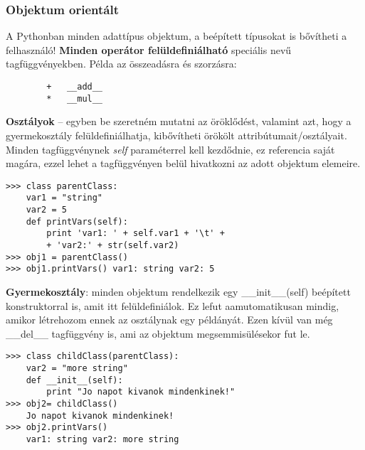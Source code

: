 \documentclass[a4paper,oneside,12pt]{article}
\begin{document}
\subsubsection{Objektum orientált}
A Pythonban minden adattípus objektum, a beépített típusokat is bővítheti a felhasználó! \textbf{Minden operátor felüldefiniálható} speciális nevű tagfüggvényekben.
Példa az összeadásra és szorzásra:
\begin{lstlisting}
		+	__add__
		*	__mul__
\end{lstlisting}

\textbf{Osztályok} -- egyben be szeretném mutatni az öröklődést, valamint azt, hogy a gyermekosztály felüldefiniálhatja, kibővítheti örökölt attribútumait/osztályait. Minden tagfüggvénynek \emph{self} paraméterrel kell kezdődnie, ez referencia saját magára, ezzel lehet a tagfüggvényen belül hivatkozni az adott objektum elemeire.
\begin{lstlisting}
>>> class parentClass:
	var1 = "string"
	var2 = 5
	def printVars(self):
		print 'var1: ' + self.var1 + '\t' +
		+ 'var2:' + str(self.var2)
>>> obj1 = parentClass()
>>> obj1.printVars() var1: string var2: 5
\end{lstlisting}

\textbf{Gyermekosztály}: minden objektum rendelkezik egy \_\_init\_\_(self) beépített konstruktorral is, amit itt felüldefiniálok. Ez lefut aamutomatikusan mindig, amikor létrehozom ennek az osztálynak egy példányát. Ezen kívül van még \_\_del\_\_ tagfüggvény is, ami az objektum megsemmisülésekor fut le.
\begin{lstlisting}
>>> class childClass(parentClass):
	var2 = "more string"
	def __init__(self):
		print "Jo napot kivanok mindenkinek!"
>>> obj2= childClass()
	Jo napot kivanok mindenkinek!
>>> obj2.printVars()
	var1: string var2: more string
\end{lstlisting}
%
\newpage
\end{document}
